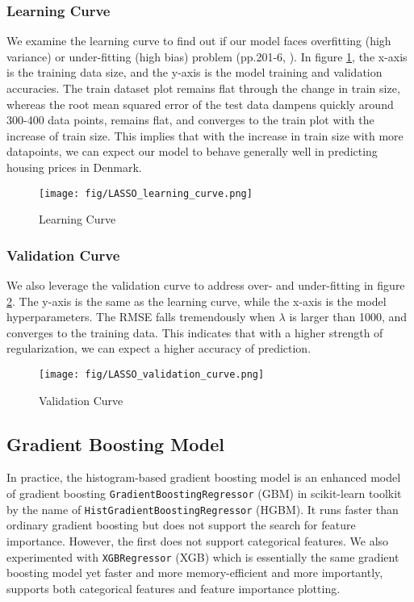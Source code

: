 \documentclass[12pt]{article} %
\begin{document}
{            \subsubsection{Learning Curve}
            We examine the learning curve to find out if our model faces overfitting (high variance) or under-fitting (high bias) problem (pp.201-6, \cite{Raschka2019}). In figure \ref{fig:learcurve}, the x-axis is the training data size, and the y-axis is the model training and validation accuracies. The train dataset plot remains flat through the change in train size, whereas the root mean squared error of the test data dampens quickly around 300-400 data points, remains flat, and converges to the train plot with the increase of train size. This implies that with the increase in train size with more datapoints, we can expect our model to behave generally well in predicting housing prices in Denmark.

            \begin{figure}[]
                \centering
                \texttt{[image: fig/LASSO\_learning\_curve.png]}
                \caption{Learning Curve}
                \label{fig:learcurve}
            \end{figure}

            \subsubsection{Validation Curve}
            We also leverage the validation curve to address over- and under-fitting in figure \ref{fig:valcurve}. The y-axis is the same as the learning curve, while the x-axis is the model hyperparameters. The RMSE falls tremendously when $\lambda$ is larger than 1000, and converges to the training data. This indicates that with a higher strength of regularization, we can expect a higher accuracy of prediction.

            \begin{figure}[]
                \centering
                \texttt{[image: fig/LASSO\_validation\_curve.png]}
                \caption{Validation Curve}
                \label{fig:valcurve}
            \end{figure}

        \subsection{Gradient Boosting Model}
            In practice, the histogram-based gradient boosting model is an enhanced model of gradient boosting \texttt{GradientBoostingRegressor} (GBM) in scikit-learn toolkit by the name of \texttt{HistGradientBoostingRegressor} (HGBM). It runs faster than ordinary gradient boosting but does not support the search for feature importance. However, the first does not support categorical features. We also experimented with \texttt{XGBRegressor} (XGB) which is essentially the same gradient boosting model yet faster and more memory-efficient and more importantly, supports both categorical features and feature importance plotting.\par
            
}
\end{document}

